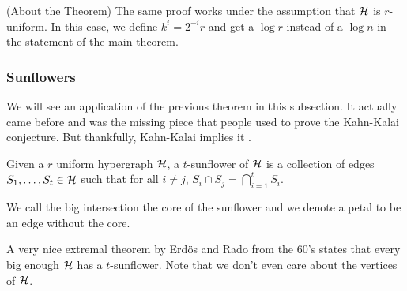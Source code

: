 \begin{remark}
	(About the Theorem) The same proof works under the assumption that
	$\mathcal{H}$ is $r$-uniform.
	In this case, we define $k^{i} = 2^{-i}r$ and get a $\log r$ instead
	of a $\log n$
	in the statement of the main theorem.
\end{remark}

\subsubsection{Sunflowers}

We will see an application of the previous theorem in this subsection.
It actually came before
and was the missing piece that people used to prove the Kahn-Kalai
conjecture. But thankfully,
Kahn-Kalai implies it \Smiley.

\begin{definition}
	Given a $r$ uniform hypergraph $\mathcal{H}$, a $t$-sunflower of $\mathcal{H}$ is a collection
	of edges $S_1, \dots, S_t \in \mathcal{H}$ such that for all $i \neq j$,
	$S_i \cap S_j = \bigcap_{i=1}^t S_i$.
\end{definition}
\begin{remark}
	We call the big intersection the core of the sunflower and we denote a petal
	to be an edge without the core.
\end{remark}

A very nice extremal theorem by Erdös and Rado from the 60's states that
every big enough $\mathcal{H}$ has a $t$-sunflower. Note that we don't even care about
the vertices of $\mathcal{H}$.

